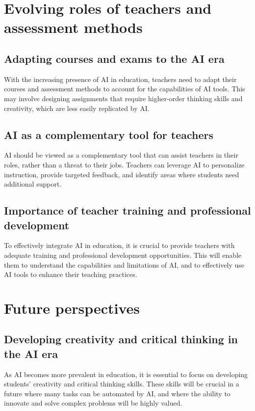 \documentclass{article}
\begin{document}
\section{Evolving roles of teachers and assessment methods}

\subsection{Adapting courses and exams to the AI era}
With the increasing presence of AI in education, teachers need to adapt their courses and assessment methods to account for the capabilities of AI tools. This may involve designing assignments that require higher-order thinking skills and creativity, which are less easily replicated by AI.

\subsection{AI as a complementary tool for teachers}
AI should be viewed as a complementary tool that can assist teachers in their roles, rather than a threat to their jobs. Teachers can leverage AI to personalize instruction, provide targeted feedback, and identify areas where students need additional support.

\subsection{Importance of teacher training and professional development}
To effectively integrate AI in education, it is crucial to provide teachers with adequate training and professional development opportunities. This will enable them to understand the capabilities and limitations of AI, and to effectively use AI tools to enhance their teaching practices.

\section{Future perspectives}

\subsection{Developing creativity and critical thinking in the AI era}
As AI becomes more prevalent in education, it is essential to focus on developing students' creativity and critical thinking skills. These skills will be crucial in a future where many tasks can be automated by AI, and where the ability to innovate and solve complex problems will be highly valued.
\end{document}
